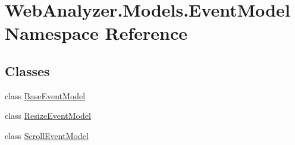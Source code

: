 \hypertarget{namespace_web_analyzer_1_1_models_1_1_event_model}{}\section{Web\+Analyzer.\+Models.\+Event\+Model Namespace Reference}
\label{namespace_web_analyzer_1_1_models_1_1_event_model}
\subsection*{Classes}
\begin{DoxyCompactItemize}
\item 
class \hyperlink{class_web_analyzer_1_1_models_1_1_event_model_1_1_base_event_model}{Base\+Event\+Model}
\item 
class \hyperlink{class_web_analyzer_1_1_models_1_1_event_model_1_1_resize_event_model}{Resize\+Event\+Model}
\item 
class \hyperlink{class_web_analyzer_1_1_models_1_1_event_model_1_1_scroll_event_model}{Scroll\+Event\+Model}
\end{DoxyCompactItemize}
